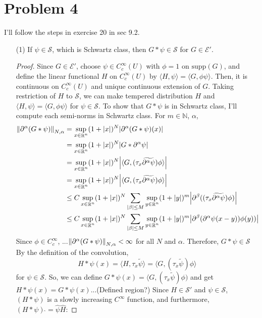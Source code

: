 \documentclass{article}
\DeclareMathOperator{\rr}{\mathbb{R}}
\begin{document}
\section*{Problem 4}
I'll follow the steps in exercise 20 in sec 9.2.
\begin{enumerate}
\item[(1)] If $\psi\in \mathcal{S}$, which is Schwartz class, then $G*\psi\in \mathcal{S}$ for $G\in \mathcal{E}'$.
\begin{proof}
Since $G\in \mathcal{E}'$, choose $\psi\in C_c^\infty(U)$ with $\phi=1$ on $\text{supp}(G)$, and define the linear functional $H$ on $C_c^\infty(U)$ by $\langle H,\psi \rangle=\langle G,\phi\psi\rangle$. Then, it is continuous on $C_c^\infty(U)$ and unique continuous extension of $G$. Taking restriction of $H$ to $\mathcal{S}$, we can make tempered distribution $H$ and $\langle H, \psi\rangle=\langle G, \phi\psi\rangle$ for $\psi\in \mathcal{S}$. To show that $G*\psi$ is in Schwartz class, I'll compute each semi-norms in Schwartz class. For $m\in\mathbb{N}$, $\alpha$,
\begin{equation*}
\begin{split}
\norm{\partial^\alpha(G*\psi)}_{N,\alpha}&=\sup_{x\in \rr^n}(1+\abs{x})^N\abs{\partial^\alpha(G*\psi)(x)}\\
&=\sup_{x\in \rr^n}(1+\abs{x})^N\abs{G*\partial^\alpha\psi} \\
&=\sup_{x\in \rr^n}(1+\abs{x})^N\abs{\langle G, (\tau_x \widetilde{\partial^\alpha\psi})\phi\rangle} \\
&=\sup_{x\in \rr^n}(1+\abs{x})^N\abs{\langle G, (\tau_x \widetilde{\partial^\alpha\psi})\phi\rangle} \\
&\leq C\sup_{x\in \rr^n}(1+\abs{x})^N\sum\limits_{\abs{\beta}\leq M}\sup_{y\in \rr^n}(1+\abs{y})^m\abs{ \partial^\beta((\tau_x\widetilde{\partial^\alpha\psi})\phi)} \\
&\leq C\sup_{x\in \rr^n}(1+\abs{x})^N\sum\limits_{\abs{\beta}\leq M}\sup_{y\in \rr^n}(1+\abs{y})^m\abs{ \partial^\beta(\partial^\alpha\psi(x-y))\phi(y))}
\end{split}
\end{equation*}
Since $\phi\in C_c^\infty$, ...$\norm{\partial^\alpha(G*\psi)}_{N,\alpha}<\infty$ for all $N$ and $\alpha$. Therefore, $G*\psi
\in \mathcal{S}$
By the definition of the convolution,
\begin{equation*}
H*\psi(x)=\langle H, \tau_x \tilde{\psi}\rangle=\langle G, (\tau_x\tilde{\psi})\phi\rangle
\end{equation*}
for $\psi\in \mathcal{S}$. So, we can define $G*\psi(x)=\langle G, (\tau_x\tilde{\psi})\phi)$ and get $H*\psi(x)=G*\psi(x)$...(Defined region?) Since $H\in \mathcal{S}'$ and $\psi\in \mathcal{S}$, $(H*\psi)$ is a slowly increasing $C^\infty$ function, and furthermore, $(H*\psi)\,\widehat{}=\hat{\psi}\hat{H}$:

\end{proof}
\end{enumerate}
\end{document}
